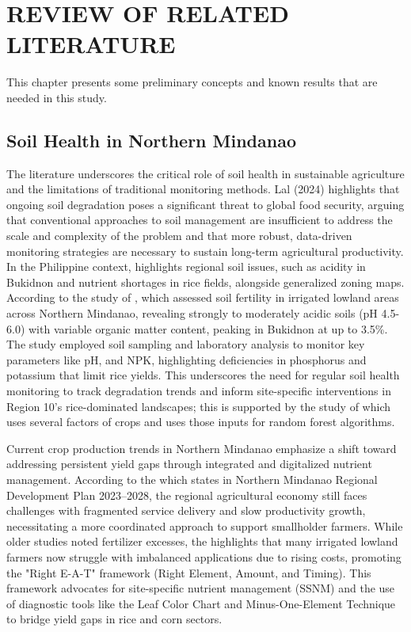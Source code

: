 \chapter{REVIEW OF RELATED LITERATURE}
{\baselineskip
	This chapter presents some preliminary concepts and known results that are needed in this study.
	
	\section{Soil Health in Northern Mindanao}
	The literature underscores the critical role of soil health in sustainable agriculture and the limitations of traditional monitoring methods. Lal (2024) highlights that ongoing soil degradation poses a significant threat to global food security, arguing that conventional approaches to soil management are insufficient to address the scale and complexity of the problem and that more robust, data-driven monitoring strategies are necessary to sustain long-term agricultural productivity. In the Philippine context, \cite{DARegionX2023} highlights regional soil issues, such as acidity in Bukidnon and nutrient shortages in rice fields, alongside generalized zoning maps. According to the study of \cite{Arlyn2024}, which assessed soil fertility in irrigated lowland areas across Northern Mindanao, revealing strongly to moderately acidic soils (pH 4.5-6.0) with variable organic matter content, peaking in Bukidnon at up to 3.5\%. The study employed soil sampling and laboratory analysis to monitor key parameters like pH, and NPK, highlighting deficiencies in phosphorus and potassium that limit rice yields. This underscores the need for regular soil health monitoring to track degradation trends and inform site-specific interventions in Region 10's rice-dominated landscapes; this is supported by the study of \cite{Sani2023CropRS} which uses several factors of crops and uses those inputs for random forest algorithms.
	
	Current crop production trends in Northern Mindanao emphasize a shift toward addressing persistent yield gaps through integrated and digitalized nutrient management. According to the \cite{NEDA2023} which states in Northern Mindanao Regional Development Plan 2023–2028, the regional agricultural economy still faces challenges with fragmented service delivery and slow productivity growth, necessitating a more coordinated approach to support smallholder farmers. While older studies noted fertilizer excesses, the \cite{PhilRice2022} highlights that many irrigated lowland farmers now struggle with imbalanced applications due to rising costs, promoting the "Right E-A-T" framework (Right Element, Amount, and Timing). This framework advocates for site-specific nutrient management (SSNM) and the use of diagnostic tools like the Leaf Color Chart and Minus-One-Element Technique to bridge yield gaps in rice and corn sectors. 
	
}

